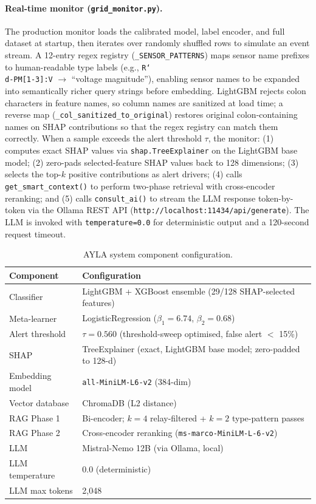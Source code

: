 \documentclass[twocolumn, 10pt, letterpaper]{article}
\begin{document}
\paragraph{Real-time monitor (\texttt{grid\_monitor.py}).}
The production monitor loads the calibrated model, label encoder, and full
dataset at startup, then iterates over randomly shuffled rows to simulate
an event stream.
A 12-entry regex registry (\texttt{\_SENSOR\_PATTERNS}) maps sensor name
prefixes to human-readable type labels
(e.g., \texttt{R{\char`\\}d-PM[1-3]:V} $\to$ ``voltage magnitude''),
enabling sensor names to be expanded into semantically richer query strings
before embedding.
LightGBM rejects colon characters in feature names, so column names are
sanitized at load time; a reverse map (\texttt{\_col\_sanitized\_to\_original})
restores original colon-containing names on SHAP contributions so that
the regex registry can match them correctly.
When a sample exceeds the alert threshold $\tau$, the monitor: (1) computes
exact SHAP values via \texttt{shap.TreeExplainer} on the LightGBM base model;
(2) zero-pads selected-feature SHAP values back to 128 dimensions;
(3) selects the top-$k$ positive contributions as alert drivers;
(4) calls \texttt{get\_smart\_context()} to perform two-phase retrieval with
cross-encoder reranking; and (5) calls \texttt{consult\_ai()} to stream the LLM
response token-by-token via the Ollama REST API
(\texttt{http://localhost:11434/api/generate}).
The LLM is invoked with \texttt{temperature=0.0} for deterministic output
and a 120-second request timeout.

\begin{table}[t]
\centering
\caption{AYLA system component configuration.}
\label{tab:config}
\begin{tabular}{ll}
\toprule
\textbf{Component} & \textbf{Configuration} \\
\midrule
Classifier        & LightGBM + XGBoost ensemble (29/128 SHAP-selected features) \\
Meta-learner      & LogisticRegression ($\beta_1{=}6.74$, $\beta_2{=}0.68$) \\
Alert threshold   & $\tau = 0.560$ (threshold-sweep optimised, false alert $<$ 15\%) \\
SHAP              & TreeExplainer (exact, LightGBM base model; zero-padded to 128-d) \\
Embedding model   & \texttt{all-MiniLM-L6-v2} (384-dim) \\
Vector database   & ChromaDB (L2 distance) \\
RAG Phase 1       & Bi-encoder; $k{=}4$ relay-filtered + $k{=}2$ type-pattern passes \\
RAG Phase 2       & Cross-encoder reranking (\texttt{ms-marco-MiniLM-L-6-v2}) \\
LLM               & Mistral-Nemo 12B (via Ollama, local) \\
LLM temperature   & 0.0 (deterministic) \\
LLM max tokens    & 2,048 \\
\bottomrule
\end{tabular}
\end{table}
\end{document}

